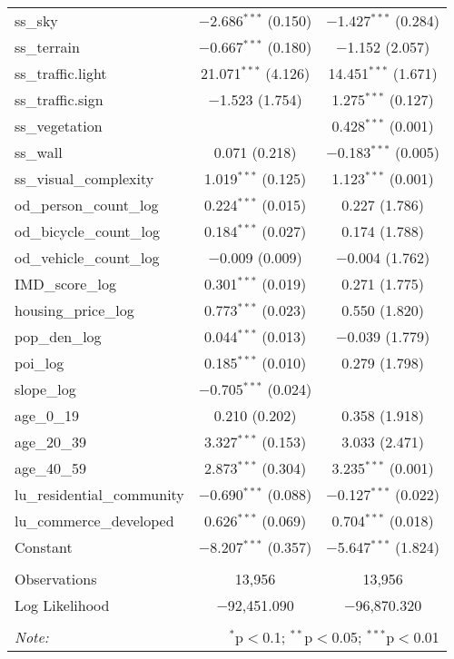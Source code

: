 \begin{table}[!htbp]
\begin{tabular}{@{\extracolsep{1pt}}lcc}
  ss\_sky & $-$2.686$^{***}$ (0.150) & $-$1.427$^{***}$ (0.284) \\ 
  ss\_terrain & $-$0.667$^{***}$ (0.180) & $-$1.152 (2.057) \\ 
  ss\_traffic.light & 21.071$^{***}$ (4.126) & 14.451$^{***}$ (1.671) \\ 
  ss\_traffic.sign & $-$1.523 (1.754) & 1.275$^{***}$ (0.127) \\ 
  ss\_vegetation &  & 0.428$^{***}$ (0.001) \\ 
  ss\_wall & 0.071 (0.218) & $-$0.183$^{***}$ (0.005) \\ 
  ss\_visual\_complexity & 1.019$^{***}$ (0.125) & 1.123$^{***}$ (0.001) \\ 
  od\_person\_count\_log & 0.224$^{***}$ (0.015) & 0.227 (1.786) \\ 
  od\_bicycle\_count\_log & 0.184$^{***}$ (0.027) & 0.174 (1.788) \\ 
  od\_vehicle\_count\_log & $-$0.009 (0.009) & $-$0.004 (1.762) \\ 
  IMD\_score\_log & 0.301$^{***}$ (0.019) & 0.271 (1.775) \\ 
  housing\_price\_log & 0.773$^{***}$ (0.023) & 0.550 (1.820) \\ 
  pop\_den\_log & 0.044$^{***}$ (0.013) & $-$0.039 (1.779) \\ 
  poi\_log & 0.185$^{***}$ (0.010) & 0.279 (1.798) \\ 
  slope\_log & $-$0.705$^{***}$ (0.024) &  \\ 
  age\_0\_19 & 0.210 (0.202) & 0.358 (1.918) \\ 
  age\_20\_39 & 3.327$^{***}$ (0.153) & 3.033 (2.471) \\ 
  age\_40\_59 & 2.873$^{***}$ (0.304) & 3.235$^{***}$ (0.001) \\ 
  lu\_residential\_community & $-$0.690$^{***}$ (0.088) & $-$0.127$^{***}$ (0.022) \\ 
  lu\_commerce\_developed & 0.626$^{***}$ (0.069) & 0.704$^{***}$ (0.018) \\ 
  Constant & $-$8.207$^{***}$ (0.357) & $-$5.647$^{***}$ (1.824) \\ 
 \hline \\[-1.8ex] 
Observations & 13,956 & 13,956 \\ 
Log Likelihood & $-$92,451.090 & $-$96,870.320 \\ 
\hline 
\hline \\[-1.8ex] 
\textit{Note:}  & \multicolumn{2}{r}{$^{*}$p$<$0.1; $^{**}$p$<$0.05; $^{***}$p$<$0.01} \\ 
\end{tabular} 
\end{table} 
